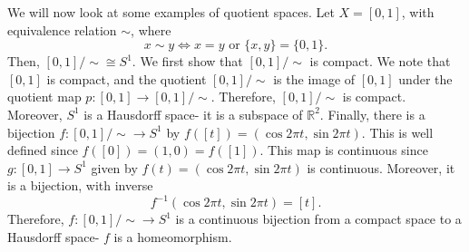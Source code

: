 \documentclass[a4paper, openany]{memoir}
\theoremstyle{definition}
\theoremstyle{plain}
\begin{document}
We will now look at some examples of quotient spaces. Let $X = [0, 1]$, with equivalence relation $\sim$, where
\[x \sim y \iff x = y \text{ or } \{x, y\} = \{0, 1\}.\]
Then, $[0, 1]/\sim \cong S^1$. We first show that $[0, 1]/\sim$ is compact. We note that $[0, 1]$ is compact, and the quotient $[0, 1]/\sim$ is the image of $[0, 1]$ under the quotient map $p: [0, 1] \to [0, 1]/\sim$. Therefore, $[0, 1]/\sim$ is compact. Moreover, $S^1$ is a Hausdorff space- it is a subspace of $\mathbb{R}^2$. Finally, there is a bijection $f: [0, 1]/\sim \to S^1$ by $f([t]) = (\cos 2\pi t, \sin 2\pi t)$. This is well defined since $f([0]) = (1, 0) = f([1])$. This map is continuous since $g: [0, 1] \to S^1$ given by $f(t) = (\cos 2\pi t, \sin 2\pi t)$ is continuous. Moreover, it is a bijection, with inverse
\[f^{-1}(\cos 2\pi t, \sin 2\pi t) = [t].\]
Therefore, $f: [0, 1]/\sim \to S^1$ is a continuous bijection from a compact space to a Hausdorff space- $f$ is a homeomorphism.
\end{document}
